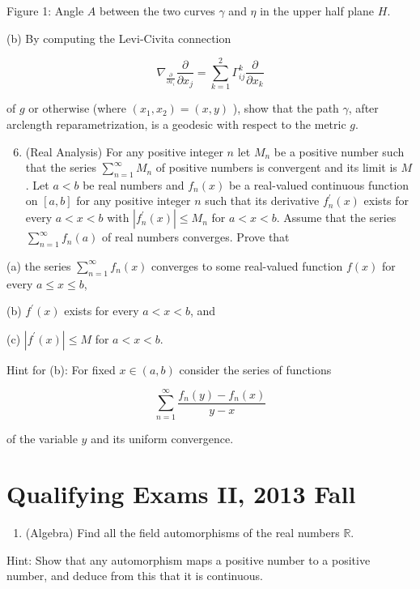 \documentclass[10pt]{article}
\begin{document}
Figure 1: Angle $A$ between the two curves $\gamma$ and $\eta$ in the upper half plane $H$.

(b) By computing the Levi-Civita connection

$$
\nabla_{\frac{\partial}{\partial x_{i}}} \frac{\partial}{\partial x_{j}}=\sum_{k=1}^{2} \Gamma_{i j}^{k} \frac{\partial}{\partial x_{k}}
$$

of $g$ or otherwise (where $\left(x_{1}, x_{2}\right)=(x, y)$ ), show that the path $\gamma$, after arclength reparametrization, is a geodesic with respect to the metric $g$.

\begin{enumerate}
  \setcounter{enumi}{5}
  \item (Real Analysis) For any positive integer $n$ let $M_{n}$ be a positive number such that the series $\sum_{n=1}^{\infty} M_{n}$ of positive numbers is convergent and its limit is $M$. Let $a<b$ be real numbers and $f_{n}(x)$ be a real-valued continuous function on $[a, b]$ for any positive integer $n$ such that its derivative $f_{n}^{\prime}(x)$ exists for every $a<x<b$ with $\left|f_{n}^{\prime}(x)\right| \leq M_{n}$ for $a<x<b$. Assume that the series $\sum_{n=1}^{\infty} f_{n}(a)$ of real numbers converges. Prove that
\end{enumerate}

(a) the series $\sum_{n=1}^{\infty} f_{n}(x)$ converges to some real-valued function $f(x)$ for every $a \leq x \leq b$,

(b) $f^{\prime}(x)$ exists for every $a<x<b$, and

(c) $\left|f^{\prime}(x)\right| \leq M$ for $a<x<b$.

Hint for (b): For fixed $x \in(a, b)$ consider the series of functions

$$
\sum_{n=1}^{\infty} \frac{f_{n}(y)-f_{n}(x)}{y-x}
$$

of the variable $y$ and its uniform convergence.

\section{Qualifying Exams II, 2013 Fall}
\begin{enumerate}
  \item (Algebra) Find all the field automorphisms of the real numbers $\mathbb{R}$.
\end{enumerate}

Hint: Show that any automorphism maps a positive number to a positive number, and deduce from this that it is continuous.
\end{document}
